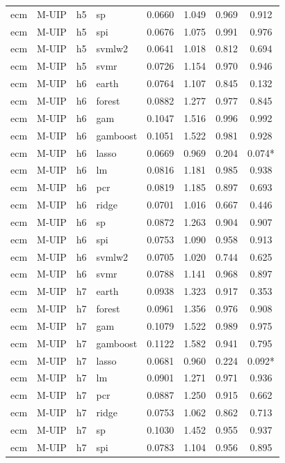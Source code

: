 \begin{ThreePartTable}
\begin{longtable}[t]{llclcccc}
ecm & M-UIP & h5 & sp & 0.0660 & 1.049 & 0.969 & 0.912\\
ecm & M-UIP & h5 & spi & 0.0676 & 1.075 & 0.991 & 0.976\\
ecm & M-UIP & h5 & svmlw2 & 0.0641 & 1.018 & 0.812 & 0.694\\
ecm & M-UIP & h5 & svmr & 0.0726 & 1.154 & 0.970 & 0.946\\
\addlinespace
ecm & M-UIP & h6 & earth & 0.0764 & 1.107 & 0.845 & 0.132\\
ecm & M-UIP & h6 & forest & 0.0882 & 1.277 & 0.977 & 0.845\\
ecm & M-UIP & h6 & gam & 0.1047 & 1.516 & 0.996 & 0.992\\
ecm & M-UIP & h6 & gamboost & 0.1051 & 1.522 & 0.981 & 0.928\\
ecm & M-UIP & h6 & lasso & 0.0669 & 0.969 & 0.204 & 0.074*\\
ecm & M-UIP & h6 & lm & 0.0816 & 1.181 & 0.985 & 0.938\\
ecm & M-UIP & h6 & pcr & 0.0819 & 1.185 & 0.897 & 0.693\\
ecm & M-UIP & h6 & ridge & 0.0701 & 1.016 & 0.667 & 0.446\\
ecm & M-UIP & h6 & sp & 0.0872 & 1.263 & 0.904 & 0.907\\
ecm & M-UIP & h6 & spi & 0.0753 & 1.090 & 0.958 & 0.913\\
ecm & M-UIP & h6 & svmlw2 & 0.0705 & 1.020 & 0.744 & 0.625\\
ecm & M-UIP & h6 & svmr & 0.0788 & 1.141 & 0.968 & 0.897\\
\addlinespace
ecm & M-UIP & h7 & earth & 0.0938 & 1.323 & 0.917 & 0.353\\
ecm & M-UIP & h7 & forest & 0.0961 & 1.356 & 0.976 & 0.908\\
ecm & M-UIP & h7 & gam & 0.1079 & 1.522 & 0.989 & 0.975\\
ecm & M-UIP & h7 & gamboost & 0.1122 & 1.582 & 0.941 & 0.795\\
ecm & M-UIP & h7 & lasso & 0.0681 & 0.960 & 0.224 & 0.092*\\
ecm & M-UIP & h7 & lm & 0.0901 & 1.271 & 0.971 & 0.936\\
ecm & M-UIP & h7 & pcr & 0.0887 & 1.250 & 0.915 & 0.662\\
ecm & M-UIP & h7 & ridge & 0.0753 & 1.062 & 0.862 & 0.713\\
ecm & M-UIP & h7 & sp & 0.1030 & 1.452 & 0.955 & 0.937\\
ecm & M-UIP & h7 & spi & 0.0783 & 1.104 & 0.956 & 0.895\\

\end{longtable}
\end{ThreePartTable}
